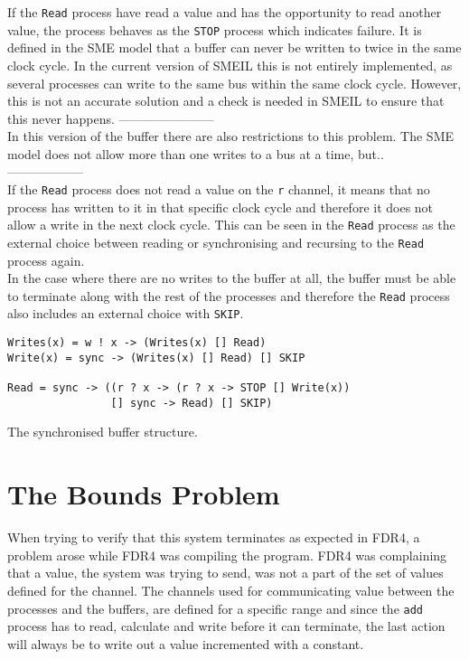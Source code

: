 If the \texttt{Read} process have read a value and has the opportunity to read another value, the process behaves as the \texttt{STOP} process which indicates failure. It is defined in the SME model that a buffer can never be written to twice in the same clock cycle. In the current version of SMEIL this is not entirely implemented, as several processes can write to the same bus within the same clock cycle. However, this is not an accurate solution and a check is needed in SMEIL to ensure that this never happens.
-----------------------\\
In this version of the buffer there are also restrictions to this problem. The SME model does not allow more than one writes to a bus at a time, but..\\
------------------\\
If the \texttt{Read} process does not read a value on the \texttt{r} channel, it means that no process has written to it in that specific clock cycle and therefore it does not allow a write in the next clock cycle. This can be seen in the \texttt{Read} process as the external choice between reading or synchronising and recursing to the \texttt{Read} process again.\\

In the case where there are no writes to the buffer at all, the buffer must be able to terminate along with the rest of the processes and therefore the \texttt{Read} process also includes an external choice with \texttt{SKIP}.


\begin{listing}
\begin{verbatim}
Writes(x) = w ! x -> (Writes(x) [] Read)
Write(x) = sync -> (Writes(x) [] Read) [] SKIP

Read = sync -> ((r ? x -> (r ? x -> STOP [] Write(x))
                [] sync -> Read) [] SKIP)
\end{verbatim}
\caption{The synchronised buffer structure.}
\label{lst:buffer}
\end{listing}

\section{The Bounds Problem}
When trying to verify that this system terminates as expected in FDR4, a problem arose while FDR4 was compiling the program. FDR4 was complaining that a value, the system was trying to send, was not a part of the set of values defined for the channel.
The channels used for communicating value between the processes and the buffers, are defined for a specific range and since the \texttt{add} process has to read, calculate and write before it can terminate, the last action will always be to write out a value incremented with a constant.\\

